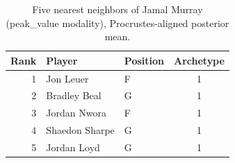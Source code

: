 \begin{table}[htbp]
  \centering\small
  \begin{tabular}{rllc}
    \toprule
    Rank & Player & Position & Archetype \\
    \midrule
    1 & Jon Leuer & F & 1 \\
    2 & Bradley Beal & G & 1 \\
    3 & Jordan Nwora & F & 1 \\
    4 & Shaedon Sharpe & G & 1 \\
    5 & Jordan Loyd & G & 1 \\
    \bottomrule
  \end{tabular}
  \caption{Five nearest neighbors of Jamal Murray (peak_value modality), Procrustes-aligned posterior mean.}
  \label{tab:Jamal_Murray_neighbors_peak_value}
\end{table}

